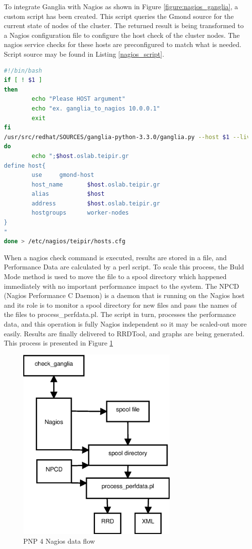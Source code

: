 To integrate Ganglia with Nagios as shown in Figure \ref{figure:nagios_ganglia}, a custom script has been created. This script queries the Gmond source for the current state of nodes of the cluster. The returned result is being transformed to a Nagios configuration file to configure the host check of the cluster nodes. The nagios service checks for these hosts are preconfigured to match what is needed. Script source may be found in Listing \ref{nagios_script}.

\begin{lstlisting}[language=bash,caption=Ganglia to Nagios script,label=nagios_script]
#!/bin/bash
if [ ! $1 ]
then
        echo "Please HOST argument"
        echo "ex. ganglia_to_nagios 10.0.0.1"
        exit
fi
/usr/src/redhat/SOURCES/ganglia-python-3.3.0/ganglia.py --host $1 --live | while read host
do
        echo ";$host.oslab.teipir.gr
define host{
        use     gmond-host
        host_name       $host.oslab.teipir.gr
        alias           $host
        address         $host.oslab.teipir.gr
        hostgroups      worker-nodes
}
"
done > /etc/nagios/teipir/hosts.cfg
\end{lstlisting}

When a nagios check command is executed, results are stored in a file, and Performance Data are calculated by a perl script. To scale this process, the Buld Mode method is used to move the file to a spool directory which happened immediately with no important performance impact to the system. The NPCD (Nagios Performance C Daemon) is a daemon that is running on the Nagios host and its role is to monitor a spool directory for new files and pass the names of the files to process\_perfdata.pl. The script in turn, processes the performance data, and this operation is fully Nagios independent so it may be scaled-out more easily. Results are finally delivered to RRDTool, and graphs are being generated. This process is presented in Figure \ref{figure:pnp4nagios}

\begin{figure}[htb]
\centering
 \includegraphics[width=80mm]{images/npcd_pnp4nagios.eps}
\caption{PNP 4 Nagios data flow}
\label{figure:pnp4nagios}
\end{figure}

